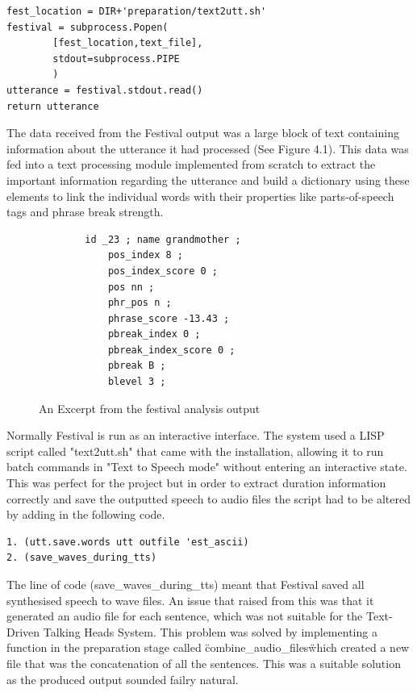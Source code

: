 \documentclass[bsc,frontabs,twoside,singlespacing,parskip,deptreport]{infthesis}
\begin{document}
\begin{lstlisting}
fest_location = DIR+'preparation/text2utt.sh'
festival = subprocess.Popen(
		[fest_location,text_file], 
		stdout=subprocess.PIPE
		)
utterance = festival.stdout.read()
return utterance
\end{lstlisting}

The data received from the Festival output was a large block of text containing information about the utterance it had processed (See Figure 4.1). This data was fed into a text processing module implemented from scratch to extract the important information regarding the utterance and build a dictionary using these elements to link the individual words with their properties like parts-of-speech tags and phrase break strength.

\begin{figure}
	\begin{lstlisting}
		id _23 ; name grandmother ;
			pos_index 8 ;
			pos_index_score 0 ;
			pos nn ; 
			phr_pos n ; 
			phrase_score -13.43 ; 
			pbreak_index 0 ; 
			pbreak_index_score 0 ; 
			pbreak B ; 
			blevel 3 ; 
	\end{lstlisting}
	\caption{An Excerpt from the festival analysis output}
\end{figure}


Normally Festival is run as an interactive interface. The system used a LISP script called "text2utt.sh" that came with the installation, allowing it to run batch commands in "Text to Speech mode" without entering an interactive state. This was perfect for the project but in order to extract duration information correctly and save the outputted speech to audio files the script had to be altered by adding in the following code. 

\begin{lstlisting}
1. (utt.save.words utt outfile 'est_ascii) 
2. (save_waves_during_tts)
\end{lstlisting}

The line of code (save\_waves\_during\_tts) meant that Festival saved all synthesised speech to wave files. An issue that raised from this was that it generated an audio file for each sentence, which was not suitable for the Text-Driven Talking Heads System. This problem was solved by implementing a function in the preparation stage called \"combine\_audio\_files\" which created a new file that was the concatenation of all the sentences. This was a suitable solution as the produced output sounded failry natural.
\end{document}
